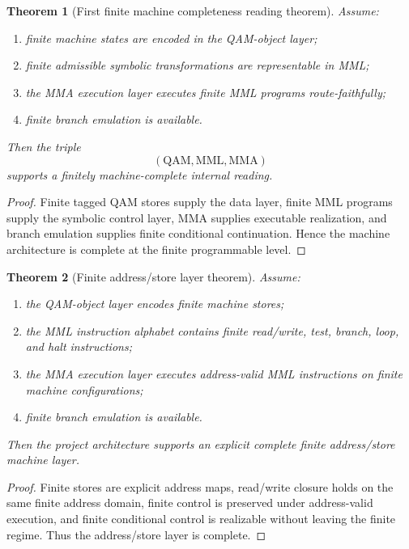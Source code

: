\documentclass[12pt,a4paper]{article}
\newtheorem{theorem}{Theorem}[section]
\begin{document}
\begin{theorem}[First finite machine completeness reading theorem]\label{thm:first-finite-machine-completeness-computational-layer}
Assume:
\begin{enumerate}[leftmargin=2em]
 \item finite machine states are encoded in the QAM-object layer;
 \item finite admissible symbolic transformations are representable in MML;
 \item the MMA execution layer executes finite MML programs route-faithfully;
 \item finite branch emulation is available.
\end{enumerate}
Then the triple
\[
(\mathrm{QAM},\mathrm{MML},\mathrm{MMA})
\]
supports a finitely machine-complete internal reading.
\end{theorem}

\begin{proof}
Finite tagged QAM stores supply the data layer, finite MML programs supply the symbolic control layer, MMA supplies executable realization, and branch emulation supplies finite conditional continuation. Hence the machine architecture is complete at the finite programmable level.
\end{proof}

\begin{theorem}[Finite address/store layer theorem]\label{thm:finite-address-store-completeness-computational-layer}
Assume:
\begin{enumerate}[leftmargin=2em]
 \item the QAM-object layer encodes finite machine stores;
 \item the MML instruction alphabet contains finite read/write, test, branch, loop, and halt instructions;
 \item the MMA execution layer executes address-valid MML instructions on finite machine configurations;
 \item finite branch emulation is available.
\end{enumerate}
Then the project architecture supports an explicit complete finite address/store machine layer.
\end{theorem}

\begin{proof}
Finite stores are explicit address maps, read/write closure holds on the same finite address domain, finite control is preserved under address-valid execution, and finite conditional control is realizable without leaving the finite regime. Thus the address/store layer is complete.
\end{proof}
\end{document}
